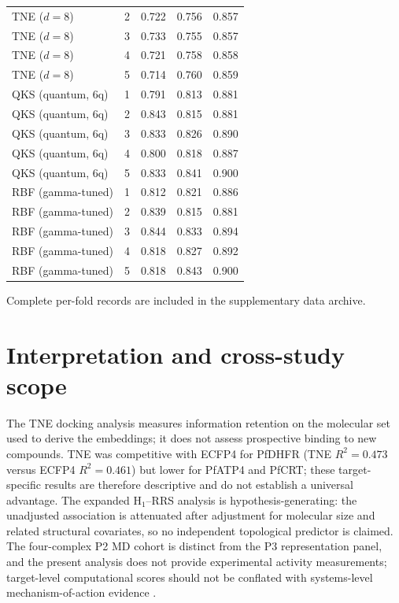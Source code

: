 \documentclass[11pt,a4paper]{article}
\begin{document}
\begin{table}[htbp]
\begin{tabularx}{\textwidth}{l l S[table-format=1.3] S[table-format=1.3] S[table-format=1.3]}
TNE ($d=8$) & 2 & 0.722 & 0.756 & 0.857 \\
TNE ($d=8$) & 3 & 0.733 & 0.755 & 0.857 \\
TNE ($d=8$) & 4 & 0.721 & 0.758 & 0.858 \\
TNE ($d=8$) & 5 & 0.714 & 0.760 & 0.859 \\
\midrule
QKS (quantum, 6q) & 1 & 0.791 & 0.813 & 0.881 \\
QKS (quantum, 6q) & 2 & 0.843 & 0.815 & 0.881 \\
QKS (quantum, 6q) & 3 & 0.833 & 0.826 & 0.890 \\
QKS (quantum, 6q) & 4 & 0.800 & 0.818 & 0.887 \\
QKS (quantum, 6q) & 5 & 0.833 & 0.841 & 0.900 \\
\midrule
RBF (gamma-tuned) & 1 & 0.812 & 0.821 & 0.886 \\
RBF (gamma-tuned) & 2 & 0.839 & 0.815 & 0.881 \\
RBF (gamma-tuned) & 3 & 0.844 & 0.833 & 0.894 \\
RBF (gamma-tuned) & 4 & 0.818 & 0.827 & 0.892 \\
RBF (gamma-tuned) & 5 & 0.818 & 0.843 & 0.900 \\
\bottomrule
\end{tabularx}
\end{table}

Complete per-fold records are included in the supplementary data archive.

\section{Interpretation and cross-study scope}
\label{sec:interpretation_scope}

The TNE docking analysis measures information retention on the molecular set used to derive the embeddings; it does not assess prospective binding to new compounds. TNE was competitive with ECFP4 for PfDHFR (TNE $R^2 = \num{0.473}$ versus ECFP4 $R^2 = \num{0.461}$) but lower for PfATP4 and PfCRT; these target-specific results are therefore descriptive and do not establish a universal advantage. The expanded H$_1$--RRS analysis is hypothesis-generating: the unadjusted association is attenuated after adjustment for molecular size and related structural covariates, so no independent topological predictor is claimed. The four-complex P2 MD cohort is distinct from the P3 representation panel, and the present analysis does not provide experimental activity measurements; target-level computational scores should not be conflated with systems-level mechanism-of-action evidence \citep{Trapotsi2022MoA}.
\end{document}
